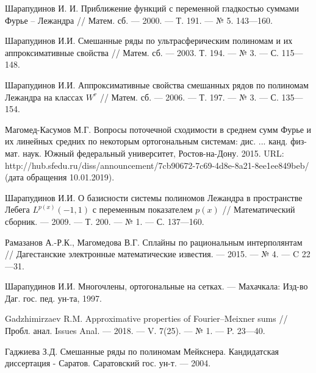 \begin{thebibliography}{111}
Шарапудинов И. И. Приближение функций с переменной гладкостью суммами Фурье -- Лежандра // Матем. сб. --- 2000. --- Т. 191. --- № 5. 143---160.






Шарапудинов И.И. Смешанные ряды по ультрасферическим полиномам и их аппроксимативные свойства // Матем. сб. --- 2003. Т. 194. --- № 3. --- С. 115---148.






Шарапудинов И.И. Аппроксимативные свойства смешанных рядов по полиномам Лежандра на классах $W^r$ // Матем. сб. --- 2006. --- Т. 197. --- № 3. --- С. 135---154.





Магомед-Касумов М.Г. Вопросы поточечной сходимости в среднем сумм Фурье и их линейных средних по некоторым ортогональным системам: дис. ... канд. физ-мат. наук. Южный федеральный университет, Ростов-на-Дону. 2015. URL: http://hub.sfedu.ru/diss/announcement/7cb90672-7c69-4d8e-8a21-8ee1ee849beb/ (дата обращения 10.01.2019).




Шарапудинов И.И. О базисности системы полиномов Лежандра в пространстве Лебега $L^{p(x)}(-1,1)$ с переменным показателем $p(x)$ // Математический сборник. --- 2009. --- Т. 200. --- № 1. --- С. 137---160.



Рамазанов А.-Р.К., Магомедова В.Г.  Сплайны по рациональным интерполянтам
// Дагестанские электронные математические известия. --- 2015. --- № 4. --- C 22---31.




{Шарапудинов И.И.} Многочлены, ортогональные на сетках. --- Махачкала: Изд-во Даг. гос. пед. ун-та, 1997.




{Gadzhimirzaev R.M.} Approximative properties of Fourier–Meixner sums // Пробл. анал. Issues Anal. --- 2018. --- V. 7(25). --- № 1. --- P. 23---40.




{Гаджиева З.Д.} Смешанные ряды по полиномам Мейкснера. Кандидатская диссертация - Саратов. Саратовский гос. ун-т. --- 2004.




\end{thebibliography}

